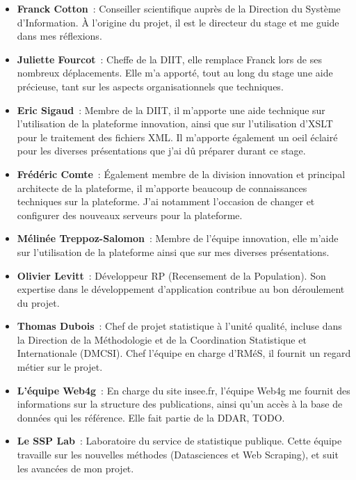 \begin{itemize}
    \item \textbf{Franck Cotton}~: Conseiller scientifique auprès de la Direction du Système d'Information. À l'origine du projet, il est le directeur du stage et me guide dans mes réflexions.
    \vspace{5pt}
    \item \textbf{Juliette Fourcot}~: Cheffe de la DIIT, elle remplace Franck lors de ses nombreux déplacements. Elle m'a apporté, tout au long du stage une aide précieuse, tant sur les aspects organisationnels que techniques.
    \vspace{5pt}
    \item \textbf{Eric Sigaud}~: Membre de la DIIT, il m'apporte une aide technique sur l'utilisation de la plateforme innovation, ainsi que sur l'utilisation d'XSLT pour le traitement des fichiers XML. Il m'apporte également un oeil éclairé pour les diverses présentations que j'ai dû préparer durant ce stage.
    \vspace{5pt}
    \item \textbf{Frédéric Comte}~: Également membre de la division innovation et principal architecte de la plateforme, il m'apporte beaucoup de connaissances techniques sur la plateforme. J'ai notamment l'occasion de changer et configurer des nouveaux serveurs pour la plateforme.
    \vspace{5pt}
    \item \textbf{Mélinée Treppoz-Salomon}~: Membre de l'équipe innovation, elle m'aide sur l'utilisation de la plateforme ainsi que sur mes diverses présentations.
    \vspace{5pt}
    \item \textbf{Olivier Levitt}~: Développeur RP (Recensement de la Population). Son expertise dans le développement d'application contribue au bon déroulement du projet.
    \vspace{5pt}
    \item \textbf{Thomas Dubois}~: Chef de projet statistique à l'unité qualité, incluse dans la Direction de la Méthodologie et de la Coordination Statistique et Internationale (DMCSI). Chef l'équipe en charge d'RMéS, il fournit un regard métier sur le projet.
    \vspace{5pt}
    \item \textbf{L'équipe Web4g}~: En charge du site insee.fr, l'équipe Web4g me fournit des informations sur la structure des publications, ainsi qu'un accès à la base de données qui les référence. Elle fait partie de la DDAR, TODO.
    \vspace{5pt}
    \item \textbf{Le SSP Lab}~: Laboratoire du service de statistique publique. Cette équipe travaille sur les nouvelles méthodes (Datasciences et Web Scraping), et suit les avancées de mon projet.
    \newline
\end{itemize}

